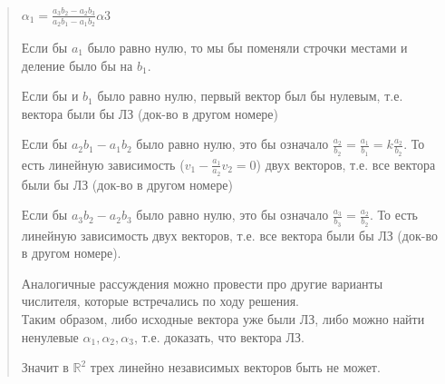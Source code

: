 \documentclass{article}
\begin{document}
\begin{quote}
    $\alpha_1 = \frac{a_3b_2 - a_2b_3}{a_2b_1 - a_1b_2} \alpha 3$


    Если бы $a_1$ было равно нулю, то мы бы поменяли строчки местами и деление было бы на $b_1$.
    
    Если бы и $b_1$ было равно нулю, первый вектор был бы нулевым, т.е. вектора были бы ЛЗ (док-во в другом номере)

    Если бы $a_2b_1 - a_1b_2$ было равно нулю, это бы означало $\frac{a_2}{b_2} = \frac{a_1}{b_1} = k \frac{a_2}{b_2}$. То есть линейную зависимость ($v_1 - \frac{a_1}{a_2} v_2 = 0$) двух векторов, т.е. все вектора были
    бы ЛЗ (док-во в другом номере)
    
    Если бы $a_3b_2 - a_2b_3$ было равно нулю, это бы означало $\frac{a_3}{b_3} = \frac{a_2}{b_2}$. То есть линейную зависимость двух векторов, т.е. все вектора были
    бы ЛЗ (док-во в другом номере). 
    
    Аналогичные рассуждения можно провести про другие варианты числителя, которые встречались по ходу решения.\\

    Таким образом, либо исходные вектора уже были ЛЗ, либо можно найти ненулевые $\alpha_1, \alpha_2, \alpha_3$, т.е. доказать, что вектора ЛЗ.
    
    Значит в $\mathbb{R}^2$ трех линейно независимых векторов быть не может.
\end{quote}
\end{document}

